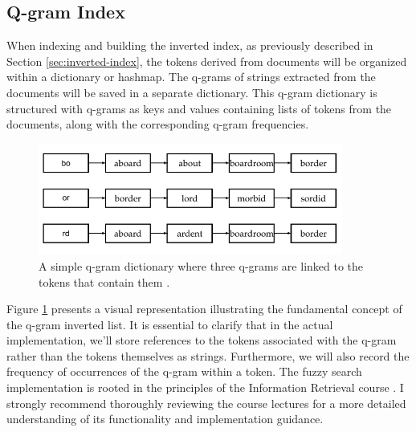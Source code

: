 \subsection{Q-gram Index}
When indexing and building the inverted index, as previously described in Section \ref{sec:inverted-index}, the tokens derived from documents will be organized within a dictionary or hashmap. The q-grams of strings extracted from the documents will be saved in a separate dictionary. This q-gram dictionary is structured with q-grams as keys and values containing lists of tokens from the documents, along with the corresponding q-gram frequencies.


\begin{figure}[h]	
     \centering
         \includegraphics[width=10cm]{figures/q-gram.png}
              \caption{A simple q-gram dictionary where three q-grams are linked to the tokens that contain them \cite{manning2008}.}
     \label{fig:q-gram-example}
\end{figure}

Figure \ref{fig:q-gram-example} presents a visual representation illustrating the fundamental concept of the q-gram inverted list. It is essential to clarify that in the actual implementation, we'll store references to the tokens associated with the q-gram rather than the tokens themselves as strings. Furthermore, we will also record the frequency of occurrences of the q-gram within a token. The fuzzy search implementation is rooted in the principles of the Information Retrieval course \cite{freiburg2023ir}. I strongly recommend thoroughly reviewing the course lectures for a more detailed understanding of its functionality and implementation guidance.
